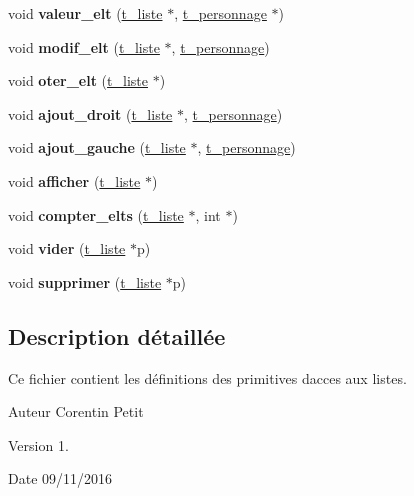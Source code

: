 \begin{DoxyCompactItemize}
\item 
void {\bfseries valeur\+\_\+elt} (\hyperlink{a00007}{t\+\_\+liste} $\ast$, \hyperlink{a00010}{t\+\_\+personnage} $\ast$)\hypertarget{a00026_aa016faa5e2ea12e04177251d111df07a}{}\label{a00026_aa016faa5e2ea12e04177251d111df07a}

\item 
void {\bfseries modif\+\_\+elt} (\hyperlink{a00007}{t\+\_\+liste} $\ast$, \hyperlink{a00010}{t\+\_\+personnage})\hypertarget{a00026_af48029077e382e3f7ff227c1ce8be5d9}{}\label{a00026_af48029077e382e3f7ff227c1ce8be5d9}

\item 
void {\bfseries oter\+\_\+elt} (\hyperlink{a00007}{t\+\_\+liste} $\ast$)\hypertarget{a00026_a89973d73d0150915530a583a62599968}{}\label{a00026_a89973d73d0150915530a583a62599968}

\item 
void {\bfseries ajout\+\_\+droit} (\hyperlink{a00007}{t\+\_\+liste} $\ast$, \hyperlink{a00010}{t\+\_\+personnage})\hypertarget{a00026_a8276e5c2a79bb28b7452184678a551fe}{}\label{a00026_a8276e5c2a79bb28b7452184678a551fe}

\item 
void {\bfseries ajout\+\_\+gauche} (\hyperlink{a00007}{t\+\_\+liste} $\ast$, \hyperlink{a00010}{t\+\_\+personnage})\hypertarget{a00026_a62451ec33d49a154efb6332bbc0ee413}{}\label{a00026_a62451ec33d49a154efb6332bbc0ee413}

\item 
void {\bfseries afficher} (\hyperlink{a00007}{t\+\_\+liste} $\ast$)\hypertarget{a00026_a1495faff01bebb63f22d610d32d1aab4}{}\label{a00026_a1495faff01bebb63f22d610d32d1aab4}

\item 
void {\bfseries compter\+\_\+elts} (\hyperlink{a00007}{t\+\_\+liste} $\ast$, int $\ast$)\hypertarget{a00026_a9679aebb698baa75a24ccd47b870a772}{}\label{a00026_a9679aebb698baa75a24ccd47b870a772}

\item 
void {\bfseries vider} (\hyperlink{a00007}{t\+\_\+liste} $\ast$p)\hypertarget{a00026_a7ecbb44530688750d47fa00a96d6add8}{}\label{a00026_a7ecbb44530688750d47fa00a96d6add8}

\item 
void {\bfseries supprimer} (\hyperlink{a00007}{t\+\_\+liste} $\ast$p)\hypertarget{a00026_aab08b37ee056b9411e2265637fb3af1c}{}\label{a00026_aab08b37ee056b9411e2265637fb3af1c}

\end{DoxyCompactItemize}


\subsection{Description détaillée}
Ce fichier contient les définitions des primitives d\textquotesingle{}acces aux listes. 

\begin{DoxyAuthor}{Auteur}
Corentin Petit 
\end{DoxyAuthor}
\begin{DoxyVersion}{Version}
1. 
\end{DoxyVersion}
\begin{DoxyDate}{Date}
09/11/2016 
\end{DoxyDate}
